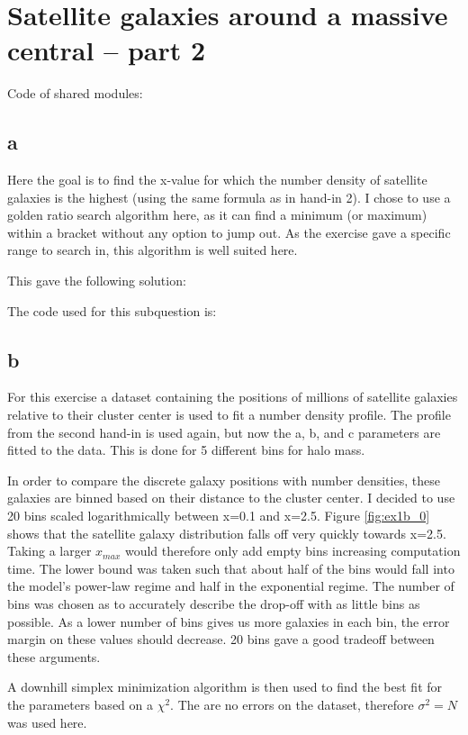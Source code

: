 \section{Satellite galaxies around a massive central – part 2}
Code of shared modules:


\newpage
\subsection*{a}
Here the goal is to find the x-value for which the number density of satellite galaxies is the highest (using the same formula as in hand-in 2).
I chose to use a golden ratio search algorithm here, as it can find a minimum (or maximum) within a bracket without any option to jump out.
As the exercise gave a specific range to search in, this algorithm is well suited here.

This gave the following solution:


The code used for this subquestion is:


\subsection*{b}
For this exercise a dataset containing the positions of millions of satellite galaxies relative to their cluster center is used to fit a number density profile.
The profile from the second hand-in is used again, but now the a, b, and c parameters are fitted to the data.
This is done for 5 different bins for halo mass.

In order to compare the discrete galaxy positions with number densities, these galaxies are binned based on their distance to the cluster center.
I decided to use 20 bins scaled logarithmically between x=0.1 and x=2.5. 
Figure \ref{fig:ex1b_0} shows that the satellite galaxy distribution falls off very quickly towards x=2.5. 
Taking a larger $x_{max}$ would therefore only add empty bins increasing computation time.
The lower bound was taken such that about half of the bins would fall into the model's power-law regime and half in the exponential regime.
The number of bins was chosen as to accurately describe the drop-off with as little bins as possible.
As a lower number of bins gives us more galaxies in each bin, the error margin on these values should decrease.
20 bins gave a good tradeoff between these arguments.

A downhill simplex minimization algorithm is then used to find the best fit for the parameters based on a $\chi^2$.
The are no errors on the dataset, therefore $\sigma^2 = N$ was used here.

